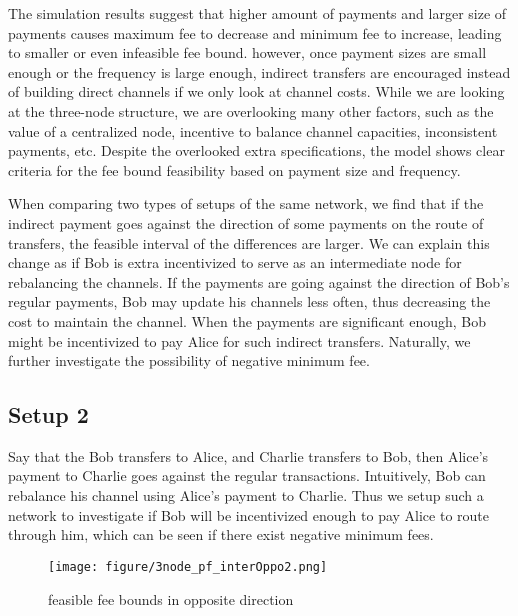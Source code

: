 \documentclass[twocolumn,10pt]{report}
\begin{document}
The simulation results suggest that higher amount of payments and larger size of payments causes maximum fee to decrease and minimum fee to increase, leading to smaller or even infeasible fee bound. however, once payment sizes are small enough or the frequency is large enough, indirect transfers are encouraged instead of building direct channels if we only look at channel costs. While we are looking at the three-node structure, we are overlooking many other factors, such as the value of a centralized node, incentive to balance channel capacities, inconsistent payments, etc. Despite the overlooked extra specifications, the model shows clear criteria for the fee bound feasibility based on payment size and frequency.

When comparing two types of setups of the same network, we find that if the indirect payment goes against the direction of some payments on the route of transfers, the feasible interval of the differences are larger. We can explain this change as if Bob is extra incentivized to serve as an intermediate node for rebalancing the channels. If the payments are going against the direction of Bob's regular payments, Bob may update his channels less often, thus decreasing the cost to maintain the channel. When the payments are significant enough, Bob might be incentivized to pay Alice for such indirect transfers. Naturally, we further investigate the possibility of negative minimum fee. 



\subsection{Setup 2}
Say that the Bob transfers to Alice, and Charlie transfers to Bob, then Alice's payment to Charlie goes against the regular transactions. Intuitively, Bob can rebalance his channel using Alice's payment to Charlie. Thus we setup such a network to investigate if Bob will be incentivized enough to pay Alice to route through him, which can be seen if there exist negative minimum fees.

\begin{figure}[t]
    \begin{center}
    \setlength{\unitlength}{0.012500in}%
    \texttt{[image: figure/3node\_pf\_interOppo2.png]}
    \end{center}
    \caption{feasible fee bounds in opposite direction}
    \label{figure_3Node11} 
    \end{figure}
\end{document}
